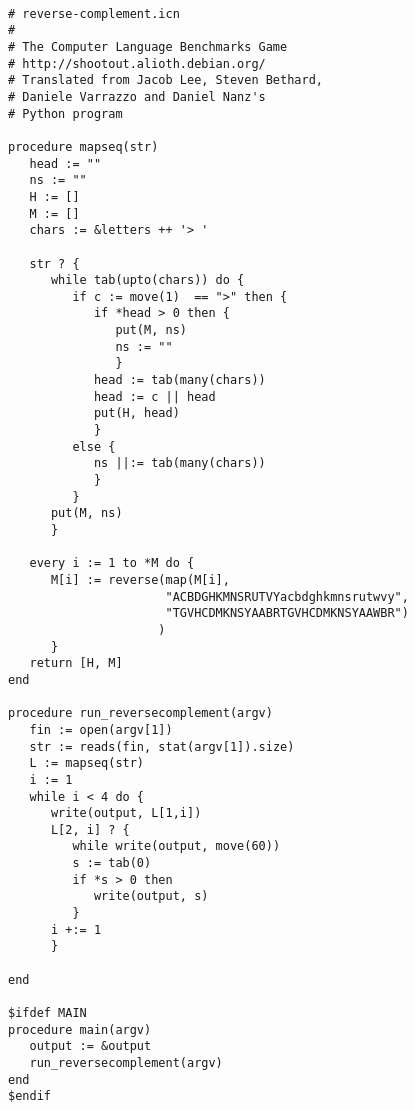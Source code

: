 \documentclass[letterpaper,12pt]{article}
\begin{document}
\begin{verbatim}

# reverse-complement.icn
#
# The Computer Language Benchmarks Game
# http://shootout.alioth.debian.org/
# Translated from Jacob Lee, Steven Bethard,
# Daniele Varrazzo and Daniel Nanz's 
# Python program

procedure mapseq(str)
   head := ""
   ns := ""
   H := []
   M := []
   chars := &letters ++ '> '
   
   str ? {
      while tab(upto(chars)) do {
         if c := move(1)  == ">" then {
            if *head > 0 then {
               put(M, ns)
               ns := ""
               }
            head := tab(many(chars))
            head := c || head
            put(H, head)
            }
         else {
            ns ||:= tab(many(chars)) 
            }
         }
      put(M, ns)
      }

   every i := 1 to *M do {
      M[i] := reverse(map(M[i],
                      "ACBDGHKMNSRUTVYacbdghkmnsrutwvy",
                      "TGVHCDMKNSYAABRTGVHCDMKNSYAAWBR")
                     ) 
      }
   return [H, M]
end

procedure run_reversecomplement(argv)
   fin := open(argv[1])
   str := reads(fin, stat(argv[1]).size)
   L := mapseq(str)  
   i := 1
   while i < 4 do {
      write(output, L[1,i])
      L[2, i] ? {
         while write(output, move(60))
         s := tab(0)
         if *s > 0 then 
            write(output, s)
         }
      i +:= 1
      }
   
end

$ifdef MAIN
procedure main(argv)
   output := &output
   run_reversecomplement(argv)
end
$endif

\end{verbatim}

\newpage
\end{document}
